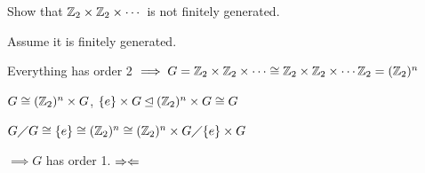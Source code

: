 \begin{example}
    Show that $\mathbb{Z}_2\times\mathbb{Z}_2\times\cdots$ is not
    finitely generated.

    Assume it is finitely generated.

    Everything has order 2 
    $\implies G=\mathbb{Z}_2\times\mathbb{Z}_2\times\cdots \cong
    \mathbb{Z}_2\times\mathbb{Z}_2\times\cdots\mathbb{Z}_2=(\mathbb{Z}_2)^n$

    $G \cong (\mathbb{Z}_2)^n\times G$, $\{e\}\times G \unlhd (\mathbb{Z}_2)^n\times G \cong G$

    $G\diagup G\cong \{e\} \cong (\mathbb{Z}_2)^n \cong (\mathbb{Z}_2)^n\times G \diagup \{e\}\times G$

    $\implies G$ has order 1. $\Rightarrow \Leftarrow$
\end{example}